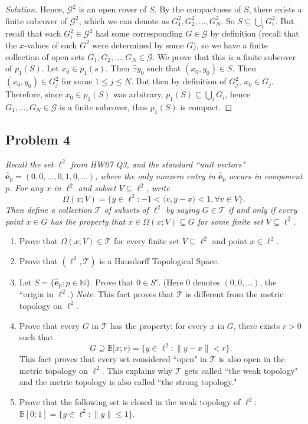 \documentclass{article}
\newcommand{\N}{{\mathbb N}}
\begin{document}
\begin{enumerate}
\begin{proof}[Solution]
		Hence, $\mathcal{G}^2$ is an open cover of $S$.
		By the compactness of $S$, there exists a finite subcover of $\mathcal{G}^2$,
		which we can denote as $G_1^2, G_2^2, \dots, G_N^2$.
		So $S \subseteq \bigcup_i G_i^2$.
		But recall that each $G_i^2 \in \mathcal{G}^2$ had some corresponding
		$G \in \mathcal{G}$ by definition
		(recall that the $x$-values of each $G^2$ were determined by some $G$),
		so we have a finite collection of open sets $G_1,G_2,\dots,G_N \in \mathcal{G}$.
		We prove that this is a finite subcover of $p_1(S)$.
		Let $x_0 \in p_1(s)$.
		Then $\exists y_0$ such that $(x_0,y_0) \in S$.
		Then $(x_0,y_0) \in G^2_j$ for some $1 \leq j \leq N$.
		But then by definition of $G^2_j$, $x_0 \in G_j$.
		Therefore, since $x_0 \in p_1(S)$ was arbitrary,
		$p_1(S) \subseteq \bigcup_i G_i$,
		hence $G_1,\dots,G_N \in \mathcal{G}$ is a finite subcover,
		thus $p_1(S)$ is compact.
	\end{proof}
\end{enumerate}
\clearpage

\subsection*{Problem 4}
{\it Recall the set $\ell^2$ from HW07 Q3,
and the standard ``unit vectors" $\hat{\mathbf{e}}_p = (0,0,\dots,0,1,0,\dots)$,
where the only nonzero entry in $\hat{\mathbf{e}}_p$ occurs in component $p$.
For any $x$ in $\ell^2$ and subset $V \subseteq \ell^2$, write
\[
	\Omega(x;V) = \{y \in \ell^2 \colon -1 < \langle v,y-x\rangle<1, \forall v \in V\}.
\]
Then define a collection $\mathcal{T}$ of subsets of $\ell^2$ by saying
$G \in \mathcal{T}$ if and only if every point $x \in G$ has the property
that $x \in \Omega(x;V) \subseteq G$ for some \emph{finite set} $V \subseteq \ell^2$.
\begin{enumerate}
	\item Prove that $\Omega(x;V) \in \mathcal{T}$ for every finite set
		$V \subseteq \ell^2$ and point $x \in \ell^2$.
	\item Prove that $(\ell^2, \mathcal{T})$ is a Hausdorff Topological Space.
	\item Let $S = \{\hat{\mathbf{e}}_p \colon p \in \N\}$.
		Prove that $0 \in S'$.
		(Here $0$ denotes $(0,0,\dots)$, the ``origin in $\ell^2$.)
		\emph{Note}: This fact proves that $\mathcal{T}$ is
		different from the metric topology on $\ell^2$.
	\item Prove that every $G$ in $\mathcal{T}$ has the property:
		for every $x$ in $G$, there exists $r>0$ such that
		\[
			G \supseteq \mathbb{B}[x;r) = \{y \in \ell^2 \colon
			\lVert y - x \rVert < r\}.
		\]
		This fact proves that every set considered ``open" in $\mathcal{T}$
		is also open in the metric topology on $\ell^2$.
		This explains why $\mathcal{T}$ gets called ``the weak topology"
		and the metric topology is also called ``the strong topology."
	\item Prove that the following set is closed in the weak topology of $\ell^2$:
		$\mathbb{B}[0;1] = \{y \in \ell^2 \colon \lVert y \rVert \leq 1\}$.
\end{enumerate}}
\end{document}
